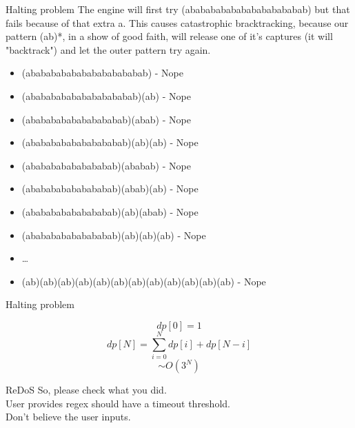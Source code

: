 \documentclass{beamer}
\begin{document}
\begin{CJK*}{UTF8}{bsmi}
    \begin{frame}{Halting problem}
        The engine will first try (abababababababababababab) but that
        fails because of that extra a. This causes catastrophic bracktracking,
        because our pattern (ab)*, in a show of good faith, will release
        one of it's captures (it will "backtrack") and let the outer
        pattern try again.
        \begin{itemize}
            \item (abababababababababababab) - Nope
            \item (ababababababababababab)(ab) - Nope
            \item (abababababababababab)(abab) - Nope
            \item (abababababababababab)(ab)(ab) - Nope
            \item (ababababababababab)(ababab) - Nope
            \item (ababababababababab)(abab)(ab) - Nope
            \item (ababababababababab)(ab)(abab) - Nope
            \item (ababababababababab)(ab)(ab)(ab) - Nope
            \item \dots
            \item (ab)(ab)(ab)(ab)(ab)(ab)(ab)(ab)(ab)(ab)(ab)(ab) - Nope
        \end{itemize}
    \end{frame}

    \begin{frame}{Halting problem}
        \begin{center}
            \LARGE
            $$dp[0] = 1$$
            $$dp[N]=\sum^{N}_{i=0}{dp[i] + dp[N-i]} $$
            $$\sim O(3^N) $$
        \end{center}
    \end{frame}

    \begin{frame}{ReDoS}
        So, please check what you did.\\
        User provides regex should have a timeout threshold.\\
        Don't believe the user inputs.
    \end{frame}


\end{CJK*}
\end{document}
